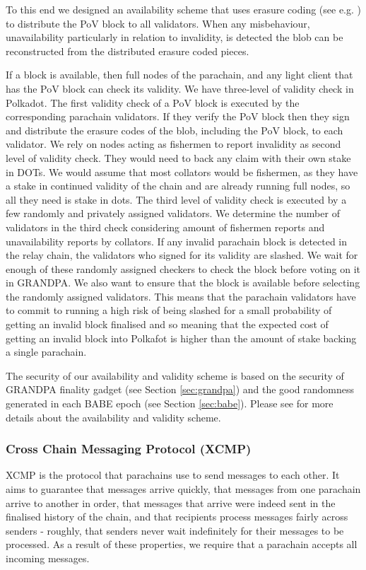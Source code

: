 To this end we designed an availability scheme that uses erasure coding (see e.g. \cite{availabilityETH2}) to distribute the PoV block to all validators.
When any misbehaviour, unavailability particularly in relation to invalidity, is detected the blob can be reconstructed from the distributed erasure coded pieces.

If a block is available, then full nodes of the parachain, and any light client that has the PoV block can check its validity. We have three-level of validity check in Polkadot. The first validity check of a PoV block is executed by the corresponding parachain validators. If they verify the PoV block then they sign and distribute the erasure codes of the blob, including the PoV block, to each validator.
We rely on nodes acting as fishermen to report invalidity as second level of validity check. They would need to back any claim with their own stake in DOTs. We would assume that most collators would be fishermen, as they have a stake in continued validity of the chain and are already running full nodes, so all they need is stake in dots. The third level of validity check is executed by a few randomly and privately assigned validators. We determine the number of validators in the third check considering amount of fishermen reports and unavailability reports by collators. If  any invalid parachain block is detected in the relay chain, the validators who signed for its validity are slashed.
We wait for enough of these randomly assigned checkers to check the block before voting on it in GRANDPA. We also  want to ensure that the block is available before selecting the randomly assigned validators. This means that the parachain validators have to commit to running a high risk of being slashed for a small probability of getting an invalid block finalised and so meaning that the expected cost of getting an invalid block into Polkafot is higher than the amount of stake backing a single parachain.

The security of our availability and validity scheme is based on the security of GRANDPA finality gadget (see Section \ref{sec:grandpa}) and the good randomness generated in each BABE epoch (see Section \ref{sec:babe}). Please see \cite{availandvalid} for more details about the availability and validity scheme.


\subsubsection{Cross Chain Messaging Protocol (XCMP)} \label{sec:XCMP}
XCMP is the protocol that parachains use to send messages to each other. It aims to guarantee that messages arrive quickly, that messages from one parachain arrive to another in order,
that messages that arrive were indeed sent in the finalised history of the chain,
and that recipients process messages fairly across senders - roughly, that senders never wait indefinitely for their messages to be processed. As a result of these properties, we require that a parachain accepts all incoming messages.

